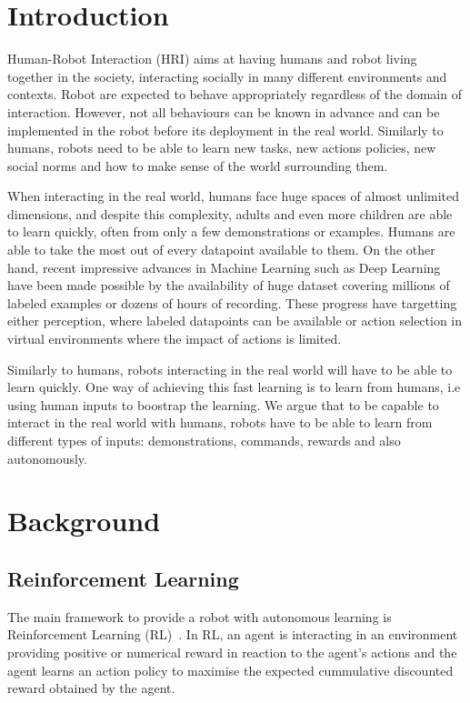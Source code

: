 \documentclass[letterpaper]{article} %
\begin{document}
\section{Introduction}

Human-Robot Interaction (HRI) aims at having humans and robot living together
in the society, interacting socially in many different environments and
contexts. Robot are expected to behave appropriately regardless of the domain
of interaction. However, not all behaviours can be known in advance and can be
implemented in the robot before its deployment in the real world. Similarly to
 humans, robots need
to be able to learn new tasks, new actions policies, new social norms and how
to make sense of the world surrounding them.

When interacting in the real world, humans face huge spaces of almost unlimited
dimensions, and despite this complexity, adults and even more children are able
to learn quickly, often from only a few demonstrations or examples. Humans are
able to take the most out of every datapoint available to them. On the other
hand, recent impressive advances in Machine Learning such as Deep Learning~\cite{lecun2015deep}
have been made possible by the availability of huge dataset covering millions
of labeled examples or dozens of hours of recording. These progress have
targetting either perception, where labeled datapoints can be available or
action selection in virtual environments where the impact of actions is
limited.

Similarly to humans, robots interacting in the real world will have to be able
to learn quickly. One way of achieving this fast learning is to learn from
humans, i.e using human inputs to boostrap the learning. We argue that to be
capable to interact in the real world with humans, robots have to be able to
learn from different types of inputs: demonstrations, commands, rewards and 
also autonomously.


\section{Background}
\subsection{Reinforcement Learning}

The main framework to provide a robot with autonomous learning is Reinforcement
Learning (RL)~\cite{kober2013reinforcement,sutton1998reinforcement}. In RL, an
agent is interacting in an environment
providing positive or numerical reward in reaction to the agent's actions and
the agent learns an action policy to maximise the expected cummulative discounted
reward obtained by the agent.
\end{document}

